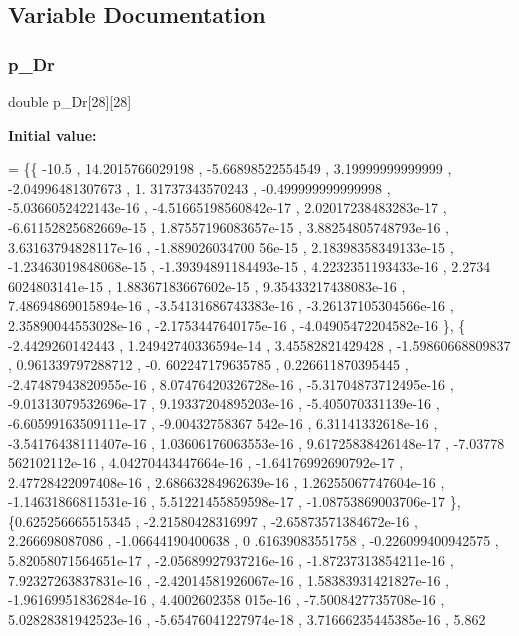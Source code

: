 \subsection{Variable Documentation}
\mbox{\label{a00521_a10d32d84835abfa5a43ca05bb5157623}} 
\subsubsection{\texorpdfstring{p\+\_\+\+Dr}{p\_Dr}}
{\footnotesize\ttfamily double p\+\_\+\+Dr\mbox{[}28\mbox{]}\mbox{[}28\mbox{]}}

{\bfseries Initial value\+:}
\begin{DoxyCode}
= \{\{            -10.5 ,  14.2015766029198 , -5.66898522554549 ,  3.19999999999999 , -2.04996481307673 ,  1.
      31737343570243 , -0.499999999999998 , -5.0366052422143e-16 , -4.51665198560842e-17 , 2.02017238483283e-17 , 
      -6.61152825682669e-15 , 1.87557196083657e-15 , 3.88254805748793e-16 , 3.63163794828117e-16 , -1.889026034700
      56e-15 , 2.18398358349133e-15 , -1.23463019848068e-15 , -1.39394891184493e-15 , 4.2232351193433e-16 , 2.2734
      6024803141e-15 , 1.88367183667602e-15 , 9.35433217438083e-16 , 7.48694869015894e-16 , -3.54131686743383e-16 
      , -3.26137105304566e-16 , 2.35890044553028e-16 , -2.1753447640175e-16 , -4.04905472204582e-16 \},
\{ -2.4429260142443 , 1.24942740336594e-14 ,  3.45582821429428 , -1.59860668809837 , 0.961339797288712 , -0.
      602247179635785 , 0.226611870395445 , -2.47487943820955e-16 , 8.07476420326728e-16 , -5.31704873712495e-16 ,
       -9.01313079532696e-17 , 9.19337204895203e-16 , -5.405070331139e-16 , -6.60599163509111e-17 , -9.00432758367
      542e-16 , 6.31141332618e-16 , -3.54176438111407e-16 , 1.03606176063553e-16 , 9.61725838426148e-17 , -7.03778
      562102112e-16 , 4.04270443447664e-16 , -1.64176992690792e-17 , 2.47728422097408e-16 , 2.68663284962639e-16 ,
       1.26255067747604e-16 , -1.14631866811531e-16 , 5.51221455859598e-17 , -1.08753869003706e-17 \},
\{0.625256665515345 , -2.21580428316997 , -2.65873571384672e-16 ,    2.266698087086 , -1.06644190400638 ,  0
      .61639083551758 , -0.226099400942575 , 5.82058071564651e-17 , -2.05689927937216e-16 , -1.87237313854211e-16 
      , 7.92327263837831e-16 , -2.42014581926067e-16 , 1.58383931421827e-16 , -1.96169951836284e-16 , 4.4002602358
      015e-16 , -7.5008427735708e-16 , 5.02828381942523e-16 , -5.65476041227974e-18 , 3.71666235445385e-16 , 5.862

\end{DoxyCode}
